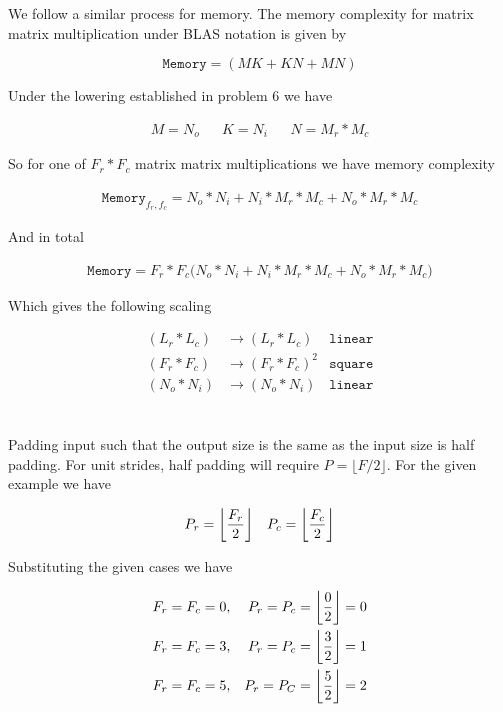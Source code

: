 \documentclass[12pt]{article}
\DeclarePairedDelimiter{\floor}{\lfloor}{\rfloor}
\begin{document}
We follow a similar process for memory. The memory complexity for matrix matrix
multiplication under BLAS notation is given by

\begin{equation}
	\texttt{Memory} = (M K + K N + M N)
\end{equation}

Under the lowering established in problem 6 we have

\begin{align}
	M = N_o && K = N_i && N = M_r * M_c
\end{align}

So for one of $F_r * F_c$ matrix matrix multiplications we have memory
complexity

\begin{align}
	\texttt{Memory}_{f_r, f_c} = N_o * N_i + N_i * M_r * M_c + N_o * M_r * M_c
\end{align}

And in total

\begin{align}
	\texttt{Memory} = F_r * F_c \bigg(N_o * N_i + N_i * M_r * M_c + N_o * M_r *
	M_c\bigg)
\end{align}

Which gives the following scaling

\begin{align}
	(L_r * L_c) &\rightarrow (L_r * L_c) &\texttt{linear}  \\
	(F_r * F_c) &\rightarrow (F_r * F_c)^2 &\texttt{square} \\
	(N_o * N_i) &\rightarrow (N_o * N_i) &\texttt{linear}
\end{align}

\section{}

Padding input such that the output size is the same as the input size is half
padding. For unit strides, half padding will require $P = \lfloor F / 2
\rfloor$. For the given example we have

\begin{align}
	P_r = \floor[\bigg]{\frac{F_r}{2}} && P_c = \floor[\bigg]{\frac{F_c}{2}}
\end{align}

Substituting the given cases we have

\begin{align}
	F_r=F_c=0, &&
	P_r = P_c = \floor[\bigg]{\frac{0}{2}} = 0 \\
	F_r=F_c=3, &&
	P_r = P_c =  \floor[\bigg]{\frac{3}{2}} = 1 \\
	F_r=F_c=5, &&
	P_r = P_C = \floor[\bigg]{\frac{5}{2}} = 2
\end{align}
\end{document}
